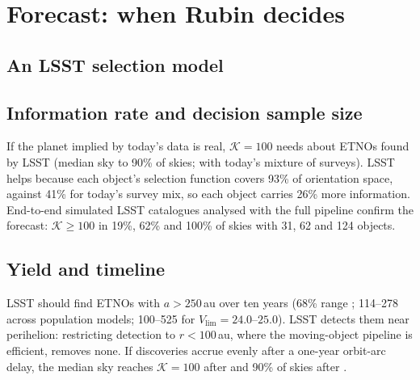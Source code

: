\documentclass[twocolumn,linenumbers]{aastex631}
\newcommand{\Kbf}{\mathcal{K}}
\begin{document}
\section{Forecast: when Rubin decides}\label{sec:forecast}

\subsection{An LSST selection model}\label{sec:lsstsel}

\subsection{Information rate and decision sample size}\label{sec:info}
If the planet implied by today's data is real, $\Kbf=100$ needs about \NKhundredLSST{} ETNOs found by LSST (median sky to 90\% of skies; \NKhundredCurrent{} with today's mixture of surveys). LSST helps because each object's selection function covers 93\% of orientation space, against 41\% for today's survey mix, so each object carries 26\% more information. End-to-end simulated LSST catalogues analysed with the full pipeline confirm the forecast: $\Kbf\ge100$ in 19\%, 62\% and 100\% of skies with 31, 62 and 124 objects.

\subsection{Yield and timeline}\label{sec:yield}
LSST should find \YieldLSST{} ETNOs with $a>250$\,au over ten years (68\% range \YieldLSSTrange{}; 114--278 across population models; 100--525 for $V_\mathrm{lim}=24.0$--$25.0$). LSST detects them near perihelion: restricting detection to $r<100$\,au, where the moving-object pipeline is efficient, removes none. If discoveries accrue evenly after a one-year orbit-arc delay, the median sky reaches $\Kbf=100$ after \YieldYearsMedian{} and 90\% of skies after \YieldYears{}.
\end{document}
